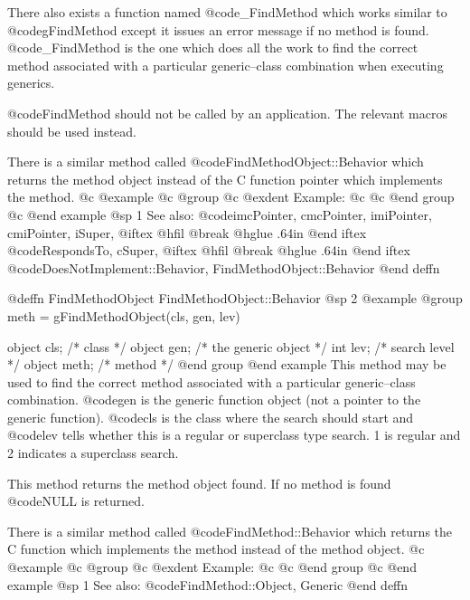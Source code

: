 There also exists a function named @code{_FindMethod} which works
similar to @code{gFindMethod} except it issues an error message if no
method is found.  @code{_FindMethod} is the one which does all the work
to find the correct method associated with a particular generic--class
combination when executing generics.

@code{FindMethod} should not be called by an application.  The relevant
macros should be used instead.

There is a similar method called @code{FindMethodObject::Behavior} which
returns the method object instead of the C function pointer which
implements the method.
@c @example
@c @group
@c @exdent Example:
@c 
@c @end group
@c @end example
@sp 1
See also:  @code{imcPointer, cmcPointer, imiPointer, cmiPointer, iSuper,}
@iftex
@hfil @break @hglue .64in    
@end iftex
@code{RespondsTo, cSuper,}
@iftex
@hfil @break @hglue .64in    
@end iftex
@code{DoesNotImplement::Behavior, FindMethodObject::Behavior}
@end deffn















@deffn {FindMethodObject} FindMethodObject::Behavior
@sp 2
@example
@group
meth = gFindMethodObject(cls, gen, lev)

object  cls;    /* class                */
object  gen;    /* the generic object   */
int     lev;    /* search level         */
object  meth;   /*  method          */
@end group
@end example
This method may be used to find the correct
method associated with a particular generic--class combination.
@code{gen} is the generic function object (not a pointer to the generic
function).  @code{cls} is the class where the search should start and
@code{lev} tells whether this is a regular or superclass type search.
1 is regular and 2 indicates a superclass search.

This method returns the method object found.  If no method is found
@code{NULL} is returned.

There is a similar method called @code{FindMethod::Behavior} which
returns the C function which implements the method instead of the method
object.
@c @example
@c @group
@c @exdent Example:
@c 
@c @end group
@c @end example
@sp 1
See also:  @code{FindMethod::Object, Generic}
@end deffn














